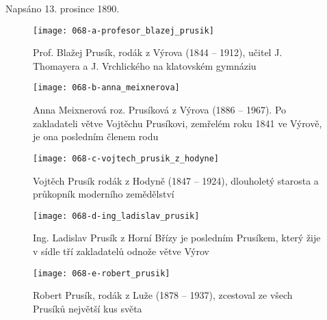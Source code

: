 \documentclass[../dejiny-rodu-prusiku.tex]{subfiles}
\begin{document}
Napsáno 13. prosince 1890.

\begin{figure}
\centering
\texttt{[image: 068-a-profesor\_blazej\_prusik]}
\caption{Prof. Blažej Prusík, rodák z Výrova (1844 – 1912), učitel J. Thomayera a J. Vrchlického na klatovském gymnáziu}
\label{fig:068-a-profesor_blazej_prusik}
\end{figure}

\begin{figure}
\centering
\texttt{[image: 068-b-anna\_meixnerova]}
\caption{Anna Meixnerová roz. Prusíková z Výrova (1886 – 1967). Po zakladateli větve Vojtěchu Prusíkovi, zemřelém roku 1841 ve Výrově, je ona posledním členem rodu}
\label{fig:068-b-anna_meixnerova}
\end{figure}

\begin{figure}
\centering
\texttt{[image: 068-c-vojtech\_prusik\_z\_hodyne]}
\caption{Vojtěch Prusík rodák z Hodyně (1847 – 1924), dlouholetý starosta a průkopník moderního zemědělství}
\label{fig:068-c-vojtech_prusik_z_hodyne}
\end{figure}

\begin{figure}
\centering
\texttt{[image: 068-d-ing\_ladislav\_prusik]}
\caption{Ing. Ladislav Prusík z Horní Břízy je posledním Prusíkem, který žije v sídle tří zakladatelů odnože větve Výrov}
\label{fig:068-d-ing_ladislav_prusik}
\end{figure}

 \begin{figure}
\centering
\texttt{[image: 068-e-robert\_prusik]}
\caption{Robert Prusík, rodák z Luže (1878 – 1937), zcestoval ze všech Prusíků největší kus světa}
\label{fig:068-e-robert_prusik}
\end{figure}
\end{document}
